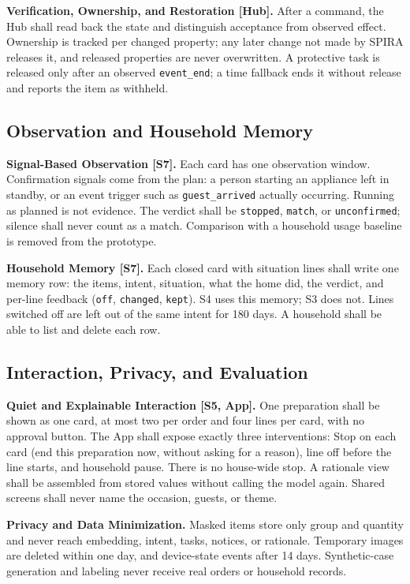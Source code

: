 \documentclass[conference]{IEEEtran}
\begin{document}
\textbf{Verification, Ownership, and Restoration [Hub].} After a command, the Hub shall read back the state and distinguish acceptance from observed effect. Ownership is tracked per changed property; any later change not made by SPIRA releases it, and released properties are never overwritten. A protective task is released only after an observed \texttt{event\_end}; a time fallback ends it without release and reports the item as withheld.

\subsection{Observation and Household Memory}
\textbf{Signal-Based Observation [S7].} Each card has one observation window. Confirmation signals come from the plan: a person starting an appliance left in standby, or an event trigger such as \texttt{guest\_arrived} actually occurring. Running as planned is not evidence. The verdict shall be \texttt{stopped}, \texttt{match}, or \texttt{unconfirmed}; silence shall never count as a match. Comparison with a household usage baseline is removed from the prototype.

\textbf{Household Memory [S7].} Each closed card with situation lines shall write one memory row: the items, intent, situation, what the home did, the verdict, and per-line feedback (\texttt{off}, \texttt{changed}, \texttt{kept}). S4 uses this memory; S3 does not. Lines switched off are left out of the same intent for 180 days. A household shall be able to list and delete each row.

\subsection{Interaction, Privacy, and Evaluation}
\textbf{Quiet and Explainable Interaction [S5, App].} One preparation shall be shown as one card, at most two per order and four lines per card, with no approval button. The App shall expose exactly three interventions: Stop on each card (end this preparation now, without asking for a reason), line off before the line starts, and household pause. There is no house-wide stop. A rationale view shall be assembled from stored values without calling the model again. Shared screens shall never name the occasion, guests, or theme.

\textbf{Privacy and Data Minimization.} Masked items store only group and quantity and never reach embedding, intent, tasks, notices, or rationale. Temporary images are deleted within one day, and device-state events after 14 days. Synthetic-case generation and labeling never receive real orders or household records.
\end{document}
